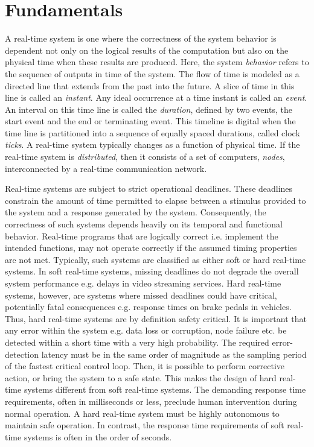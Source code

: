 \chapter{Fundamentals}
\label{chapter:fundamentals}

A real-time system \cite{liu2000real} is one where the correctness of the system behavior is dependent not only on the logical results of the computation but also on the physical time when these results are produced. Here, the system \emph{behavior} refers to the sequence of outputs in time of the system. The flow of time is modeled as a directed line that extends from the past into the future. A slice of time in this line is called an \emph{instant}. Any ideal occurrence at a time instant is called an \emph{event}. An interval on this time line is called the \emph{duration}, defined by two events, the start event and the end or terminating event. This timeline is digital when the time line is partitioned into a sequence of equally spaced durations, called clock \emph{ticks}. A real-time system typically changes as a function of physical time. If the real-time system is \emph{distributed}, then it consists of a set of computers, \emph{nodes}, interconnected by a real-time communication network.

Real-time systems are subject to strict operational deadlines. These deadlines constrain the amount of time permitted to elapse between a stimulus provided to the system and a response generated by the system. Consequently, the correctness of such systems depends heavily on its temporal and functional behavior. Real-time programs that are logically correct i.e. implement the intended functions, may not operate correctly if the assumed timing properties are not met. Typically, such systems are classified as either soft or hard real-time systems. In soft real-time systems, missing deadlines do not degrade the overall system performance e.g. delays in video streaming services. Hard real-time systems, however, are systems where missed deadlines could have critical, potentially fatal consequences e.g. response times on brake pedals in vehicles. Thus, hard real-time systems are by definition safety critical. It is important that any error within the system e.g. data loss or corruption, node failure etc. be detected within a short time with a very high probability. The required error-detection latency must be in the same order of magnitude as the sampling period of the fastest critical control loop. Then, it is possible to perform corrective action, or bring the system to a safe state. This makes the design of hard real-time systems different from soft real-time systems. The demanding response time requirements, often in milliseconds or less, preclude human intervention during normal operation. A hard real-time system must be highly autonomous to maintain safe operation. In contrast, the response time requirements of soft real-time systems is often in the order of seconds. 

